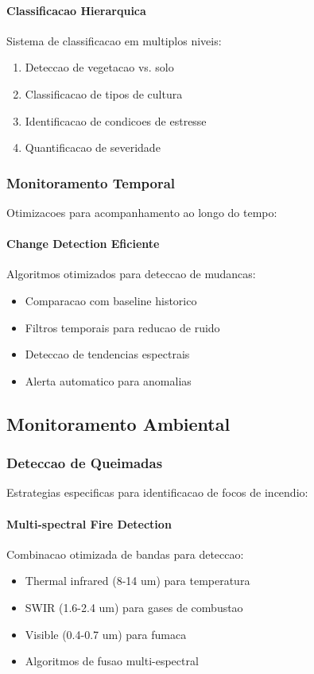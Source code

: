 \paragraph{Classificacao Hierarquica}
Sistema de classificacao em multiplos niveis:
\begin{enumerate}
    \item Deteccao de vegetacao vs. solo
    \item Classificacao de tipos de cultura
    \item Identificacao de condicoes de estresse
    \item Quantificacao de severidade
\end{enumerate}

\subsubsection{Monitoramento Temporal}
Otimizacoes para acompanhamento ao longo do tempo:

\paragraph{Change Detection Eficiente}
Algoritmos otimizados para deteccao de mudancas:
\begin{itemize}
    \item Comparacao com baseline historico
    \item Filtros temporais para reducao de ruido
    \item Deteccao de tendencias espectrais
    \item Alerta automatico para anomalias
\end{itemize}

\subsection{Monitoramento Ambiental}

\subsubsection{Deteccao de Queimadas}
Estrategias especificas para identificacao de focos de incendio:

\paragraph{Multi-spectral Fire Detection}
Combinacao otimizada de bandas para deteccao:
\begin{itemize}
    \item Thermal infrared (8-14 um) para temperatura
    \item SWIR (1.6-2.4 um) para gases de combustao
    \item Visible (0.4-0.7 um) para fumaca
    \item Algoritmos de fusao multi-espectral
\end{itemize}

